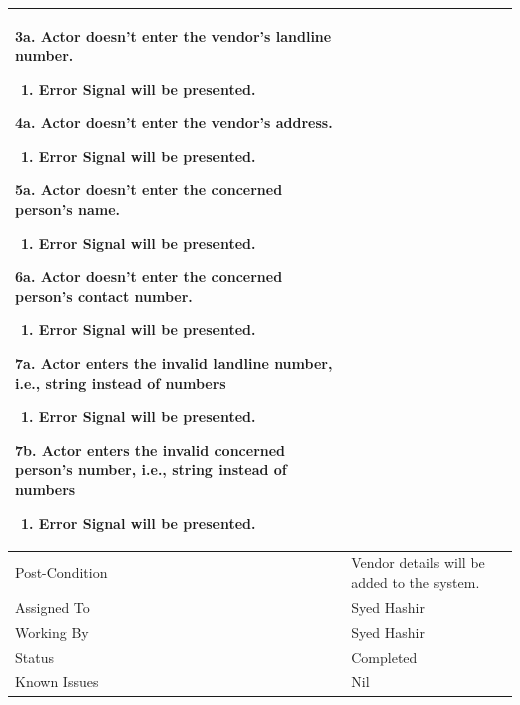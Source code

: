 \documentclass[12pt,a4paper]{article}
\begin{document}
\begin{longtable}{| p{3cm}|p{12cm}|}
3a. Actor doesn't enter the vendor's landline number.
 	\begin{enumerate}
		\item Error Signal will be presented.
	\end{enumerate}
4a. Actor doesn't enter the vendor's address.
 	\begin{enumerate}
		\item Error Signal will be presented.
	\end{enumerate}

5a. Actor doesn't enter the concerned person's name.
 	\begin{enumerate}
		\item Error Signal will be presented.
	\end{enumerate}
6a. Actor doesn't enter the concerned person's contact number.
 	\begin{enumerate}
		\item Error Signal will be presented.
	\end{enumerate}
7a. Actor enters the invalid landline number, i.e., string instead of numbers
	\begin{enumerate}
		\item Error Signal will be presented.
	\end{enumerate}
7b. Actor enters the invalid concerned person's number, i.e., string instead of numbers
	\begin{enumerate}
		\item Error Signal will be presented.
	\end{enumerate}
\\ \hline
Post-Condition &  Vendor details will be added to the system. \\ \hline
Assigned To &  Syed Hashir
\\ \hline
Working By &   Syed Hashir
\\ \hline
Status & 	Completed	
\\ \hline
Known Issues & Nil
\\\hline
\end{longtable}

\end{document}
